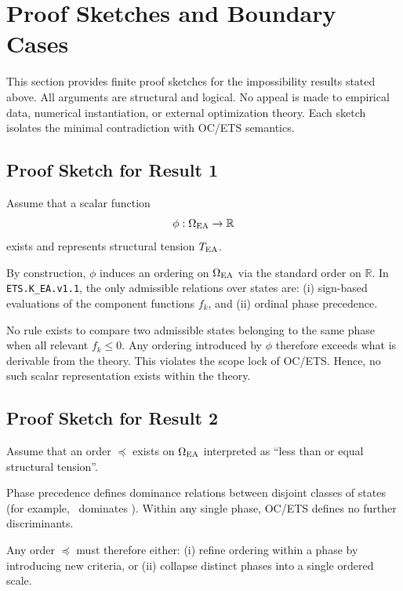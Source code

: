 ﻿%

\section{Proof Sketches and Boundary Cases}

This section provides finite proof sketches for the impossibility results
stated above. All arguments are structural and logical. No appeal is made
to empirical data, numerical instantiation, or external optimization
theory. Each sketch isolates the minimal contradiction with OC/ETS
semantics.

\subsection{Proof Sketch for Result 1}

Assume that a scalar function
\[
\phi : \Omega_{\mathrm{EA}} \rightarrow \mathbb{R}
\]
exists and represents structural tension $T_{\mathrm{EA}}$.

By construction, $\phi$ induces an ordering on $\Omega_{\mathrm{EA}}$ via the
standard order on $\mathbb{R}$. In \texttt{ETS.K\_EA.v1.1}, the only
admissible relations over states are:
(i) sign-based evaluations of the component functions $f_k$, and
(ii) ordinal phase precedence.

No rule exists to compare two admissible states belonging to the same
phase when all relevant $f_k \leq 0$. Any ordering introduced by $\phi$
therefore exceeds what is derivable from the theory. This violates the
scope lock of OC/ETS. Hence, no such scalar representation exists within
the theory.

\subsection{Proof Sketch for Result 2}

Assume that an order $\preceq$ exists on $\Omega_{\mathrm{EA}}$ interpreted as
``less than or equal structural tension''.

Phase precedence defines dominance relations between disjoint classes of
states (for example, \PHASESTOP\ dominates \PHASECOLLAPSE). Within any
single phase, OC/ETS defines no further discriminants.

Any order $\preceq$ must therefore either:
(i) refine ordering within a phase by introducing new criteria, or
(ii) collapse distinct phases into a single ordered scale.

